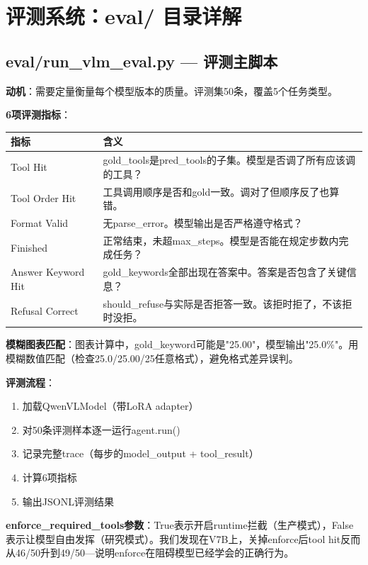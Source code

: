 \documentclass[fontset=none,11pt,a4paper]{ctexart}
\begin{document}
\section{评测系统：eval/ 目录详解}

\subsection{eval/run\_vlm\_eval.py --- 评测主脚本}

\textbf{动机}：需要定量衡量每个模型版本的质量。评测集50条，覆盖5个任务类型。

\textbf{6项评测指标}：

\begin{longtable}{lp{8cm}}
\toprule
指标 & 含义 \\
\midrule
Tool Hit & gold\_tools是pred\_tools的子集。模型是否调了所有应该调的工具？ \\
Tool Order Hit & 工具调用顺序是否和gold一致。调对了但顺序反了也算错。 \\
Format Valid & 无parse\_error。模型输出是否严格遵守格式？ \\
Finished & 正常结束，未超max\_steps。模型是否能在规定步数内完成任务？ \\
Answer Keyword Hit & gold\_keywords全部出现在答案中。答案是否包含了关键信息？ \\
Refusal Correct & should\_refuse与实际是否拒答一致。该拒时拒了，不该拒时没拒。 \\
\bottomrule
\end{longtable}

\textbf{模糊图表匹配}：图表计算中，gold\_keyword可能是"25.00"，模型输出"25.0\%"。用模糊数值匹配（检查25.0/25.00/25任意格式），避免格式差异误判。

\textbf{评测流程}：
\begin{enumerate}[nosep]
    \item 加载QwenVLModel（带LoRA adapter）
    \item 对50条评测样本逐一运行agent.run()
    \item 记录完整trace（每步的model\_output + tool\_result）
    \item 计算6项指标
    \item 输出JSONL评测结果
\end{enumerate}

\textbf{enforce\_required\_tools参数}：True表示开启runtime拦截（生产模式），False表示让模型自由发挥（研究模式）。我们发现在V7B上，关掉enforce后tool hit反而从46/50升到49/50---说明enforce在阻碍模型已经学会的正确行为。
\end{document}
